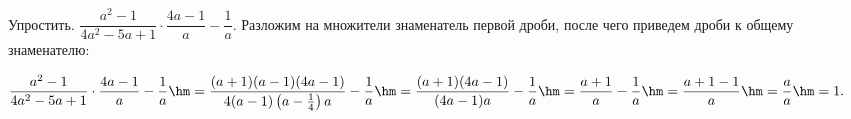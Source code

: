  Упростить. $\dfrac{a^2-1}{4a^2-5a+1}\cdot\dfrac{4a-1}{a}-\dfrac{1}{a}$.
\Solution Разложим на множители знаменатель первой дроби, после чего приведем дроби к общему знаменателю:
\begin{center}
$\dfrac{a^2-1}{4a^2-5a+1}\cdot\dfrac{4a-1}{a}-\dfrac{1}{a}\hm=\dfrac{(a+1)(a-1)(4a-1)}{4(a-1)\left(a-\frac{1}{4}\right)a}-\dfrac{1}{a}\hm=\dfrac{(a+1)(4a-1)}{(4a-1)a}-\dfrac{1}{a}\hm=\dfrac{a+1}{a}-\dfrac{1}{a}\hm=\dfrac{a+1-1}{a}\hm=\dfrac{a}{a}\hm=1.$
\end{center}
